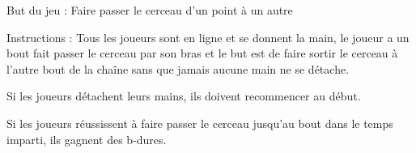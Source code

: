 \documentclass{grand-jeu}
\begin{document}
\begin{liste-materiel}
\end{liste-materiel}

\begin{regles} 
But du jeu : Faire passer le cerceau d’un point à un autre

Instructions : Tous les joueurs sont en ligne et se donnent la main, le joueur a un bout fait passer le cerceau par son bras et le but est de faire sortir le cerceau à l’autre bout de la chaîne sans que jamais aucune main ne se détache.

Si les joueurs détachent leurs mains, ils doivent recommencer au début.

Si les joueurs réussissent à faire passer le cerceau jusqu'au bout dans le temps imparti, ils gagnent des b-dures.
\end{regles}

\begin{moments-stop}
\end{moments-stop}
\end{document}

